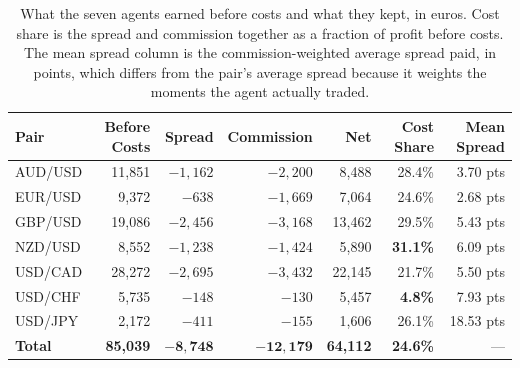 \begin{table}[htb!]
\centering
\footnotesize
\begin{tabular}{@{}lrrrrrr@{}}
\toprule
\textbf{Pair} & \textbf{Before Costs} & \textbf{Spread} & \textbf{Commission} & \textbf{Net} & \textbf{Cost Share} & \textbf{Mean Spread} \\
\midrule
AUD/USD & 11,851 & $-1,162$ & $-2,200$ & 8,488 & 28.4\% & 3.70 pts \\
EUR/USD & 9,372 & $-638$ & $-1,669$ & 7,064 & 24.6\% & 2.68 pts \\
GBP/USD & 19,086 & $-2,456$ & $-3,168$ & 13,462 & 29.5\% & 5.43 pts \\
NZD/USD & 8,552 & $-1,238$ & $-1,424$ & 5,890 & \textbf{31.1\%} & 6.09 pts \\
USD/CAD & 28,272 & $-2,695$ & $-3,432$ & 22,145 & 21.7\% & 5.50 pts \\
USD/CHF & 5,735 & $-148$ & $-130$ & 5,457 & \textbf{4.8\%} & 7.93 pts \\
USD/JPY & 2,172 & $-411$ & $-155$ & 1,606 & 26.1\% & 18.53 pts \\
\midrule
\textbf{Total} & \textbf{85,039} & $\mathbf{-8,748}$ & $\mathbf{-12,179}$ & \textbf{64,112} & \textbf{24.6\%} & --- \\
\bottomrule
\end{tabular}
\caption{What the seven agents earned before costs and what they kept, in euros. Cost share is the spread and commission together as a fraction of profit before costs. The mean spread column is the commission-weighted average spread paid, in points, which differs from the pair's average spread because it weights the moments the agent actually traded.}
\label{Tables:Costs}
\end{table}